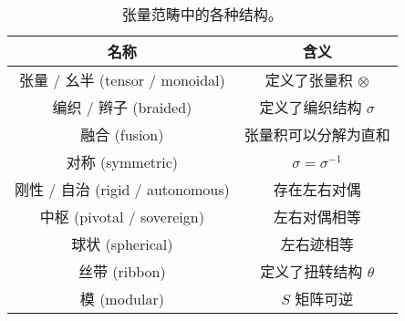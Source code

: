 \begin{table}[htb]
  \centering
  \begin{tabular}{cc}
    \toprule
      名称 & 含义 \\
    \midrule
      张量 / 幺半 (tensor / monoidal)   & 定义了张量积 $\otimes$  \\
      编织 / 辫子 (braided)             & 定义了编织结构 $\sigma$ \\
      融合        (fusion)              & 张量积可以分解为直和    \\
      对称        (symmetric)           & $\sigma=\sigma^{-1}$    \\
      刚性 / 自治 (rigid / autonomous)  & 存在左右对偶            \\
      中枢        (pivotal / sovereign) & 左右对偶相等            \\
      球状        (spherical)           & 左右迹相等              \\
      丝带        (ribbon)              & 定义了扭转结构 $\theta$ \\
      模          (modular)             & $S$ 矩阵可逆            \\
    \bottomrule
  \end{tabular}
  \caption[张量范畴中的各种结构]{张量范畴中的各种结构。}
  \label{tab:tensor-category-ingredients}
\end{table}
